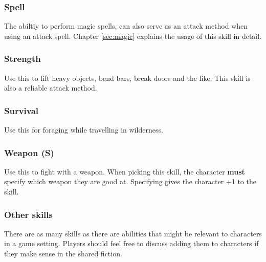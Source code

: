 \begin{multicols}{2}
\subsubsection*{Spell}
The abiltiy to perform magic spells, can also serve as an attack method when using an attack spell. Chapter \ref{sec:magic} explains the usage of this skill in detail.
\subsubsection*{Strength}
Use this to lift heavy objects, bend bars, break doors and the like. This skill is also a reliable attack method.
\subsubsection*{Survival}
Use this for foraging while travelling in wilderness.
\subsubsection*{Weapon (S)}
Use this to fight with a weapon. When picking this skill, the character \textbf{must} specify which weapon they are good at. Specifying gives the character +1 to the skill.
\subsubsection*{Other skills}
There are as many skills as there are abilities that might be relevant to characters in a game setting. Players should feel free to discuss adding them to characters if they make sense in the shared fiction.
\end{multicols}

